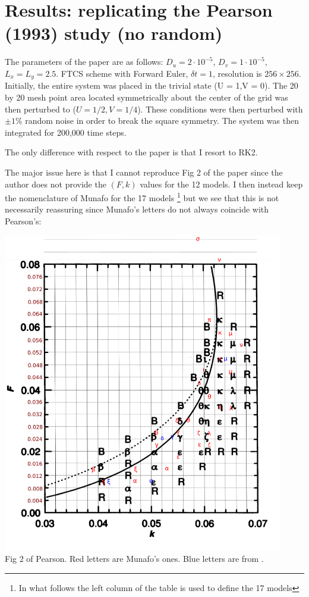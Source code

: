 \newpage
\section*{Results: replicating the Pearson (1993) study (no random)}

The parameters of the paper are as follows: $D_u=2\cdot 10^{-5}$, $D_v=1\cdot 10^{-5}$,
$L_x=L_y=2.5$. FTCS scheme with Forward Euler, $\delta t=1$, 
resolution is $256 \times 256$.
Initially, the entire system was placed in
the trivial state (U = 1,V = 0). The 20 by 20 mesh point area located symmetrically
about the center of the grid was then
perturbed to ($U = 1/2,V = 1/4$). These
conditions were then perturbed with $\pm 1\%$
random noise in order to break the square
symmetry. The system was then integrated for 200,000 time steps.

The only difference with respect to the paper is that I resort to RK2.

The major issue here is that I cannot reproduce Fig 2 of the paper since the 
author does not provide the $(F,k)$ values for the 12 models. 
I then instead keep the nomenclature of Munafo for the 17 models
\footnote{In what follows the left column of the table is used to define the 17 
models} but we see that this is not necessarily reassuring since Munafo's letters 
do not always coincide with Pearson's:
\begin{center}
\includegraphics[height=14cm]{python_codes/fieldstone_171/images/drawing.png}\\
{\captionfont Fig 2 of Pearson. Red letters are Munafo's ones. 
Blue letters are from \cite{gane22}.}
\end{center}




